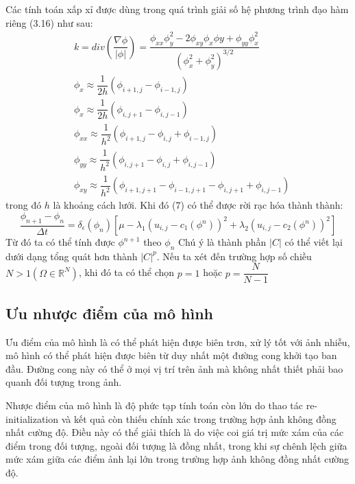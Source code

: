 \documentclass[12pt, oneside, a4]{book}
\begin{document}
Các tính toán xấp xỉ được dùng trong quá trình giải số hệ phương trình đạo hàm riêng (3.16) như sau:
\begin{equation}
\begin{split}
&k=div(\dfrac{\nabla \phi}{|\phi|})=\dfrac{\phi_{xx}\phi^2_{y}-2\phi_{xy}\phi_{x}\phi{y}+\phi_{yy}\phi^2_{x}}{(\phi^2_x+\phi^2_y)^{3/2}}\\
&\phi_x\approx \dfrac{1}{2h}(\phi_{i+1,j}-\phi_{i-1,j}) \\ 
&\phi_x\approx \dfrac{1}{2h}(\phi_{i,j+1}-\phi_{i,j-1}) \\
&\phi_{xx}\approx \dfrac{1}{h^2}(\phi_{i+1,j}-\phi_{i,j}+\phi_{i-1,j}) \\
&\phi_{yy}\approx \dfrac{1}{h^2}(\phi_{i,j+1}-\phi_{i,j}+\phi_{i,j-1}) \\
&\phi_{xy}\approx \dfrac{1}{h^2}(\phi_{i+1,j+1}-\phi_{i-1,j+1}-\phi_{i,j+1}+\phi_{i,j-1}) 
\end{split}
\end{equation}
trong đó $h$ là khoảng cách lưới. Khi đó (7) có thể được rời rạc hóa thành thành: 
\begin{equation}
\dfrac{\phi_{n+1}-\phi_{n}}{\Delta t}=\delta_{\epsilon}(\phi_{n})[\mu -\lambda_1 (u_{i,j}-c_1(\phi^{n}))^2+\lambda_2 (u_{i,j}-c_2(\phi^{n}))^2]
\end{equation}
Từ đó ta có thể tính được $\phi^{n+1}$ theo $\phi_{n}$
Chú ý là thành phần $|C|$ có thể viết lại dưới dạng tổng quát hơn thành $|C|^p$. Nếu ta xét đến trường hợp số chiều $N>1(\Omega \in \mathbb{R}^N )$, khi đó ta có thể chọn $p=1$ hoặc $p=\dfrac{N}{N-1}$
\subsection{Ưu nhược điểm của mô hình}
\hspace{0.5cm}Ưu điểm của mô hình là có thể phát hiện được biên trơn, xử lý tốt với ảnh nhiễu, mô hình có thể phát hiện được biên từ duy nhất một đường cong khởi tạo ban đầu. Đường cong này có thể ở mọi vị trí trên ảnh mà không nhất thiết phải bao quanh đối tượng trong ảnh.

Nhược điểm của mô hình  là độ phức tạp tính toán còn lớn do thao tác re-initialization và kết quả còn thiếu chính xác trong trường hợp ảnh không đồng nhất cường độ. Điều này có thể giải thích là do việc coi giá trị mức xám của các điểm trong đối tượng, ngoài đối tượng là đồng nhất, trong khi sự chênh lệch giữa mức xám giữa các điểm ảnh lại lớn trong trường hợp ảnh không đồng nhất cường độ.
\end{document}
